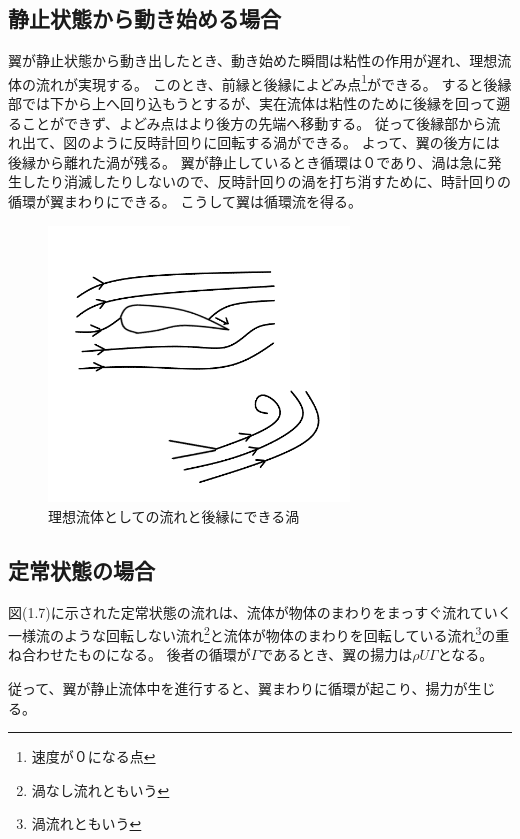 \documentclass[10pt,b5paper,papersize,dvipdfmx]{jsbook}
\begin{document}
\subsection{静止状態から動き始める場合}
翼が静止状態から動き出したとき、動き始めた瞬間は粘性の作用が遅れ、理想流体の流れが実現する。
このとき、前縁と後縁によどみ点\footnote{速度が０になる点}ができる。
すると後縁部では下から上へ回り込もうとするが、実在流体は粘性のために後縁を回って遡ることができず、よどみ点はより後方の先端へ移動する。
従って後縁部から流れ出て、図のように反時計回りに回転する渦ができる。
よって、翼の後方には後縁から離れた渦が残る。
翼が静止しているとき循環は０であり、渦は急に発生したり消滅したりしないので、反時計回りの渦を打ち消すために、時計回りの循環が翼まわりにできる。
こうして翼は循環流を得る。
\begin{figure}[ht]
  \centering
  \includegraphics[width=80mm]{img/ryuutai9.png}
  \caption{理想流体としての流れと後縁にできる渦}
\end{figure}
\subsection{定常状態の場合}
図(1.7)に示された定常状態の流れは、流体が物体のまわりをまっすぐ流れていく一様流のような回転しない流れ\footnote{渦なし流れともいう}と流体が物体のまわりを回転している流れ\footnote{渦流れともいう}の重ね合わせたものになる。
後者の循環が$\Gamma $であるとき、翼の揚力は$\rho U\Gamma$となる。
\par
\par
従って、翼が静止流体中を進行すると、翼まわりに循環が起こり、揚力が生じる。
\end{document}
